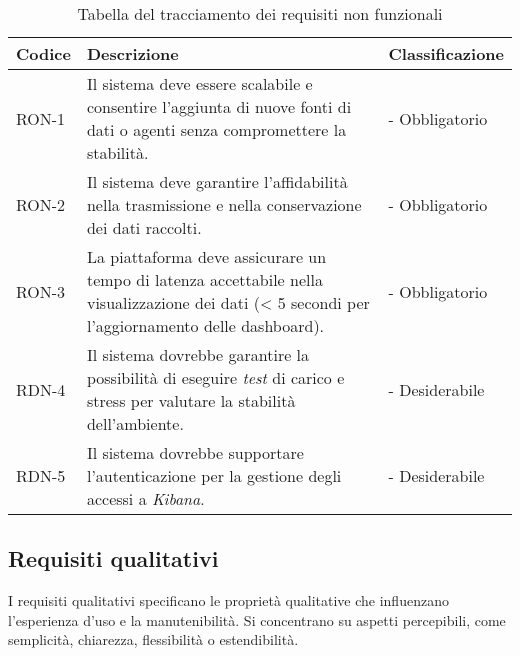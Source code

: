 \begin{table}[h]
\caption{Tabella del tracciamento dei requisiti non funzionali}
\label{tab:requisiti-non-funzionali}
\begin{tabularx}{\textwidth}{lXl}
\hline\hline
\textbf{Codice} & \textbf{Descrizione} & \textbf{Classificazione}\\
\hline
RON-1    & Il sistema deve essere scalabile e consentire l'aggiunta di nuove fonti di dati o agenti senza compromettere la stabilità. & - Obbligatorio \\
\hline

\hline
RON-2    & Il sistema deve garantire l'affidabilità nella trasmissione e nella conservazione dei dati raccolti. & - Obbligatorio \\
\hline

\hline
RON-3    & La piattaforma deve assicurare un tempo di latenza accettabile nella visualizzazione dei dati (< 5 secondi per l'aggiornamento delle dashboard). & - Obbligatorio \\
\hline

\hline
RDN-4    & Il sistema dovrebbe garantire la possibilità di eseguire \emph{test} di carico e stress per valutare la stabilità dell'ambiente. & - Desiderabile \\
\hline

\hline
RDN-5    & Il sistema dovrebbe supportare l'autenticazione per la gestione degli accessi a \emph{Kibana}. & - Desiderabile \\
\hline


\end{tabularx}
\end{table}%


\newpage
\subsection{Requisiti qualitativi}
I requisiti qualitativi specificano le proprietà qualitative che influenzano l'esperienza d'uso e la manutenibilità.
Si concentrano su aspetti percepibili, come semplicità, chiarezza, flessibilità o estendibilità.

